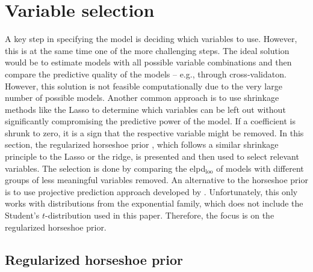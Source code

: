 \section{Variable selection}
\label{ch:varsel}
A key step in specifying the model is deciding which variables to use.
However, this is at the same time one of the more challenging steps.
The ideal solution would be to estimate models with all possible variable combinations and then compare the predictive quality of the models – e.g., through cross-validaton.
However, this solution is not feasible computationally due to the very large number of possible models.
Another common approach is to use shrinkage methods like the Lasso \citep{tibshirani_regression_1996} to determine which variables can be left out without significantly compromising the predictive power of the model.
If a coefficient is shrunk to zero, it is a sign that the respective variable might be removed.
In this section, the regularized horseshoe prior \citep{piironen_sparsity_2017}, which follows a similar shrinkage principle to the Lasso or the ridge, is presented and then used to select relevant variables. The selection is done by comparing the elpd$_{\text{loo}}$ of models with different groups of less meaningful variables removed. An alternative to the horseshoe prior is to use projective prediction approach developed by \cite{piironen_projective_2020}.
Unfortunately, this only works with distributions from the exponential family, which does not include the Student's $t$-distribution used in this paper.
Therefore, the focus is on the regularized horseshoe prior.

\subsection{Regularized horseshoe prior}

